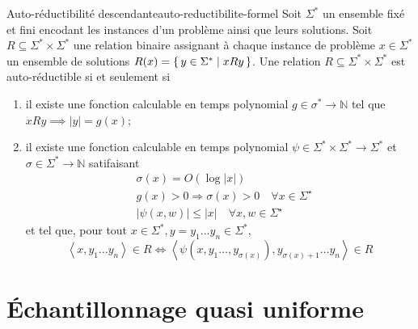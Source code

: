 \begin{maindefinition}{Auto-réductibilité descendante}{auto-reductibilite-formel}
    Soit $\Sigma^{*}$ un ensemble fixé et fini encodant les instances d'un problème ainsi que leurs solutions. Soit $R \subseteq \Sigma^{*} \times \Sigma^{*}$ une relation binaire assignant à chaque instance de problème $x \in \Sigma^{*}$ un ensemble de solutions $R(x) = \set{ y \in \Sigma^{*} \mid xRy }$. Une relation $R \subseteq \Sigma^{*} \times \Sigma^{*}$ est auto-réductible si et seulement si
    \begin{enumerate}
        \item il existe une fonction calculable en temps polynomial $g \in \sigma^{*} \to \mathbb{N}$ tel que $xRy \implies \lvert y \rvert = g(x)$;
        \item il existe une fonction calculable en temps polynomial $\psi \in \Sigma^{*} \times \Sigma^{*} \to \Sigma^{*}$ et $\sigma \in \Sigma^{*} \to \mathbb{N}$ satifaisant
        \begin{align*}
            & \sigma(x)=O(\log |x|) \\
            & g(x)>0 \Rightarrow \sigma(x)>0 \quad \forall x \in \Sigma^{\star} \\
            & |\psi(x, w)| \leqslant|x| \quad \forall x, w \in \Sigma^{\star}
        \end{align*}
        et tel que, pour tout $x \in \Sigma^{*}, y=y_1 \ldots y_n \in \Sigma^{*}$, 
        \begin{equation*}
            \left\langle x, y_1 \ldots y_n \right\rangle \in R \Leftrightarrow \left\langle \psi \left( x, y_1 \ldots, y_{\sigma(x)} \right), y_{\sigma(x)+1} \ldots y_n \right\rangle \in R
        \end{equation*}
    \end{enumerate}
\end{maindefinition}





\section{Échantillonnage quasi uniforme}

